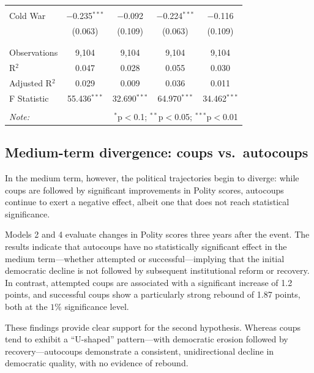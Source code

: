 \documentclass[
  12pt,
]{report}
\begin{document}
\begin{table}
{\begin{tabular}{@{\extracolsep{30pt}}lcccc}
  & & & & \\ 
 Cold War & $-$0.235$^{***}$ & $-$0.092 & $-$0.224$^{***}$ & $-$0.116 \\ 
  & (0.063) & (0.109) & (0.063) & (0.109) \\ 
  & & & & \\ 
\hline \\[-1.8ex] 
Observations & 9,104 & 9,104 & 9,104 & 9,104 \\ 
R$^{2}$ & 0.047 & 0.028 & 0.055 & 0.030 \\ 
Adjusted R$^{2}$ & 0.029 & 0.009 & 0.036 & 0.011 \\ 
F Statistic & 55.436$^{***}$ & 32.690$^{***}$ & 64.970$^{***}$ & 34.462$^{***}$ \\ 
\hline 
\hline \\[-1.8ex] 
\textit{Note:}  & \multicolumn{4}{r}{$^{*}$p$<$0.1; $^{**}$p$<$0.05; $^{***}$p$<$0.01} \\ 
\end{tabular}

}

\end{table}%

\subsection*{Medium-term divergence: coups
vs.~autocoups}\label{medium-term-divergence-coups-vs.-autocoups}

In the medium term, however, the political trajectories begin to
diverge: while coups are followed by significant improvements in Polity
scores, autocoups continue to exert a negative effect, albeit one that
does not reach statistical significance.

Models 2 and 4 evaluate changes in Polity scores three years after the
event. The results indicate that autocoups have no statistically
significant effect in the medium term---whether attempted or
successful---implying that the initial democratic decline is not
followed by subsequent institutional reform or recovery. In contrast,
attempted coups are associated with a significant increase of 1.2
points, and successful coups show a particularly strong rebound of 1.87
points, both at the \(1\%\) significance level.

These findings provide clear support for the second hypothesis. Whereas
coups tend to exhibit a ``U-shaped'' pattern---with democratic erosion
followed by recovery---autocoups demonstrate a consistent,
unidirectional decline in democratic quality, with no evidence of
rebound.
\end{document}
